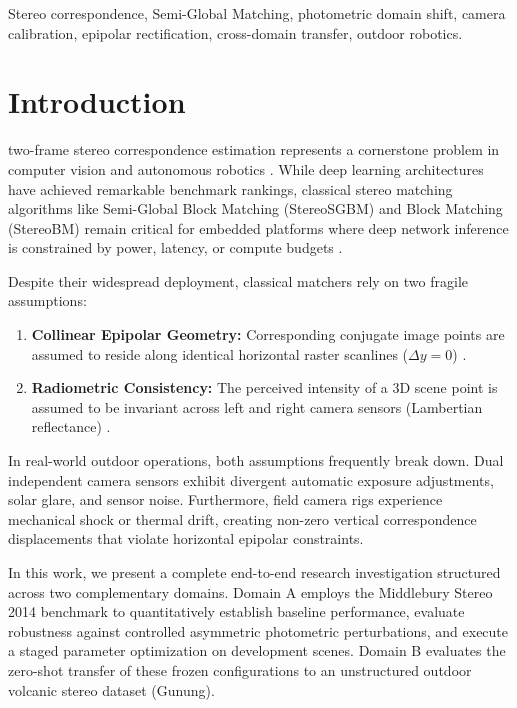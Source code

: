 \documentclass[journal]{IEEEtran}
\begin{document}
\begin{IEEEkeywords}
Stereo correspondence, Semi-Global Matching, photometric domain shift, camera calibration, epipolar rectification, cross-domain transfer, outdoor robotics.
\end{IEEEkeywords}

\section{Introduction}
 two-frame stereo correspondence estimation represents a cornerstone problem in computer vision and autonomous robotics \cite{scharstein2002taxonomy, hirschmuller2008stereo}. While deep learning architectures have achieved remarkable benchmark rankings, classical stereo matching algorithms like Semi-Global Block Matching (StereoSGBM) and Block Matching (StereoBM) remain critical for embedded platforms where deep network inference is constrained by power, latency, or compute budgets \cite{bradski2000opencv}.

Despite their widespread deployment, classical matchers rely on two fragile assumptions:
\begin{enumerate}
    \item \textbf{Collinear Epipolar Geometry:} Corresponding conjugate image points are assumed to reside along identical horizontal raster scanlines ($\Delta y = 0$) \cite{hartley2004multiple}.
    \item \textbf{Radiometric Consistency:} The perceived intensity of a 3D scene point is assumed to be invariant across left and right camera sensors (Lambertian reflectance) \cite{scharstein2014high}.
\end{enumerate}

In real-world outdoor operations, both assumptions frequently break down. Dual independent camera sensors exhibit divergent automatic exposure adjustments, solar glare, and sensor noise. Furthermore, field camera rigs experience mechanical shock or thermal drift, creating non-zero vertical correspondence displacements that violate horizontal epipolar constraints.

In this work, we present a complete end-to-end research investigation structured across two complementary domains. Domain A employs the Middlebury Stereo 2014 benchmark \cite{scharstein2014high} to quantitatively establish baseline performance, evaluate robustness against controlled asymmetric photometric perturbations, and execute a staged parameter optimization on development scenes. Domain B evaluates the zero-shot transfer of these frozen configurations to an unstructured outdoor volcanic stereo dataset (Gunung).
\end{document}
